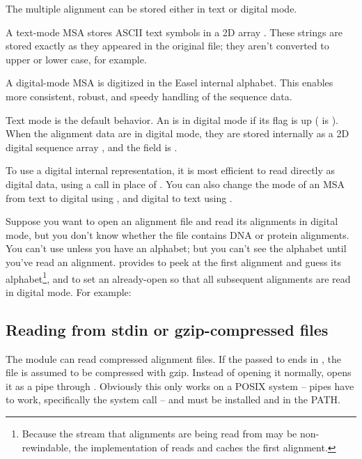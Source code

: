 The multiple alignment can be stored either in text or digital mode.

A text-mode MSA stores ASCII text symbols in a 2D array . These strings are stored exactly as
they appeared in the original file; they aren't converted to upper or
lower case, for example.

A digital-mode MSA is digitized in the Easel internal alphabet. This
enables more consistent, robust, and speedy handling of the sequence
data.

Text mode is the default behavior. An  is in digital
mode if its  flag is up ( is ). When the alignment data are in
digital mode, they are stored internally as a 2D digital sequence
array , and the 
field is .

To use a digital internal representation, it is most efficient to read
directly as digital data, using a 
call in place of . You can also change the
mode of an MSA from text to digital using
, and digital to text using
.

Suppose you want to open an alignment file and read its alignments in
digital mode, but you don't know whether the file contains DNA or
protein alignments. You can't use 
unless you have an alphabet; but you can't see the alphabet until
you've read an alignment. \Easel provides
 to peek at the first alignment
and guess its alphabet\footnote{Because the stream that alignments are
being read from may be non-rewindable, the implementation of
 reads and caches the first
alignment.}, and  to set an
already-open  so that all subsequent alignments
are read in digital mode. For example: 



\subsection{Reading from stdin or gzip-compressed files}

The module can read compressed alignment files.  If the
 passed to  ends in
, the file is assumed to be compressed with gzip. Instead
of opening it normally,  opens it as a pipe
through . Obviously this only works on a POSIX
system -- pipes have to work, specifically the  system
call -- and  must be installed and in the PATH.

